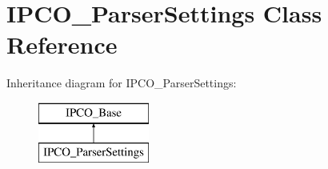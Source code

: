 \hypertarget{class_i_p_c_o___parser_settings}{\section{I\-P\-C\-O\-\_\-\-Parser\-Settings Class Reference}
\label{class_i_p_c_o___parser_settings}
}
Inheritance diagram for I\-P\-C\-O\-\_\-\-Parser\-Settings\-:\begin{figure}[H]
\begin{center}
\leavevmode
\includegraphics[height=2.000000cm]{class_i_p_c_o___parser_settings}
\end{center}
\end{figure}
